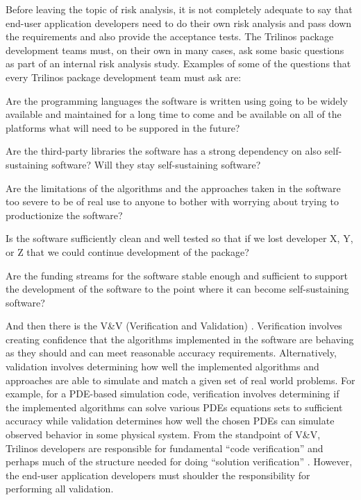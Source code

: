 \documentclass[11pt]{SANDreport}
\begin{document}
Before leaving the topic of risk analysis, it is not completely
adequate to say that end-user application developers need to do their
own risk analysis and pass down the requirements and also provide the
acceptance tests.  The Trilinos package development teams must, on
their own in many cases, ask some basic questions as part of an
internal risk analysis study.  Examples of some of the questions that
every Trilinos package development team must ask are:

\begin{compactitem}

{}\item Are the programming languages the software is written using
going to be widely available and maintained for a long time to come
and be available on all of the platforms what will need to be suppored
in the future?

{}\item Are the third-party libraries the software has a strong
dependency on also self-sustaining software?  Will they stay
self-sustaining software?

{}\item Are the limitations of the algorithms and the approaches taken
in the software too severe to be of real use to anyone to bother with
worrying about trying to productionize the software?

{}\item Is the software sufficiently clean and well tested so that if
we lost developer X, Y, or Z that we could continue development of the
package?

{}\item Are the funding streams for the software stable enough and
sufficient to support the development of the software to the point
where it can become self-sustaining software?

\end{compactitem}

And then there is the V\&V (Verification and Validation)
{}\cite{SEVVIntersections05}.  Verification involves creating
confidence that the algorithms implemented in the software are
behaving as they should and can meet reasonable accuracy requirements.
Alternatively, validation involves determining how well the
implemented algorithms and approaches are able to simulate and match a
given set of real world problems.  For example, for a PDE-based
simulation code, verification involves determining if the implemented
algorithms can solve various PDEs equations sets to sufficient
accuracy while validation determines how well the chosen PDEs can
simulate observed behavior in some physical system.  From the
standpoint of V\&V, Trilinos developers are responsible for
fundamental ``code verification'' and perhaps much of the structure
needed for doing ``solution verification''
{}\cite{SEVVIntersections05}.  However, the end-user application
developers must shoulder the responsibility for performing all
validation.
\end{document}
